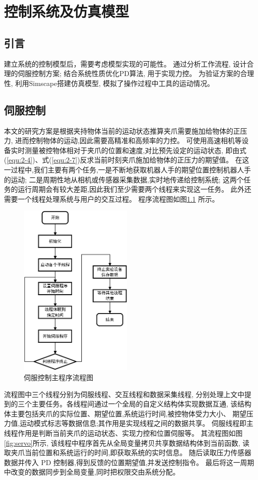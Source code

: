 \chapter{控制系统及仿真模型}

\section{引言}
建立系统的控制模型后，需要考虑模型实现的可能性。
通过分析工作流程, 设计合理的伺服控制方案; 结合系统性质优化PD算法, 用于实现力控。
为验证方案的合理性, 利用Simscape搭建仿真模型, 模拟了操作过程中工具的运动情况。

\section{伺服控制}
本文的研究方案是根据夹持物体当前的运动状态推算夹爪需要施加给物体的正压力,
进而控制物体的运动,因此需要高精准和高频率的力控。
可使用高速相机等设备实时测量被控物体相对于夹爪的位置和速度,对比预先设定的运动状态,
即由式(\ref{equ:2-4})、式(\ref{equ:2-7})反求当前时刻夹爪施加给物体的正压力的期望值。
在这一过程中,我们主要有两个任务,一是不断地获取机器人手的期望位置控制机器人手的运动;
二是周期性地从相机或传感器采集数据,实时地传递给控制系统;
这两个任务的运行周期会有较大差距,因此我们至少需要两个线程来实现这一任务。
此外还需要一个线程处理系统与用户的交互过程。
程序流程图如图\ref{fig:3-1} 所示。

\begin{figure}[!ht]
  \centering
  \includegraphics[width=5.5cm]{chapter03/pic/3-1}
  \caption{伺服控制主程序流程图\label{fig:3-1}}
  \vspace{-0.3cm}
\end{figure}

流程图中三个线程分别为伺服线程、交互线程和数据采集线程,
分别处理上文中提到的三个主要任务。各线程间通过一个全局的自定义结构体实现数据互通,
该结构体主要包括夹爪的实际位置、期望位置,系统运行时间,被控物体受力大小、
期望压力值,运动模式标志等数据信息;其作用是实现线程之间的数据共享。
伺服线程即主线程作用是判断当前夹爪的运动状态、实现力控和位置伺服等。
其流程图如图\ref{fig:servo}所示,
该线程中程序首先从全局变量拷贝共享数据结构体到当前函数,
读取夹爪当前位置和系统运行的时间,即获取系统的实时信息。
随后读取压力传感器数据并传入 PD 控制器,得到反馈的位置期望值,并发送控制指令。
最后将这一周期中改变的数据同步到全局变量,同时把权限交由系统分配。

